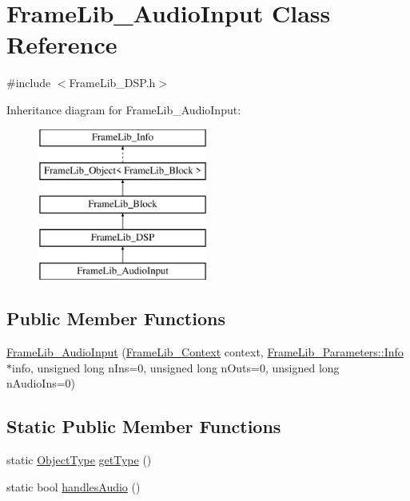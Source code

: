 \hypertarget{class_frame_lib___audio_input}{}\section{Frame\+Lib\+\_\+\+Audio\+Input Class Reference}
\label{class_frame_lib___audio_input}


{\ttfamily \#include $<$Frame\+Lib\+\_\+\+D\+S\+P.\+h$>$}

Inheritance diagram for Frame\+Lib\+\_\+\+Audio\+Input\+:\begin{figure}[H]
\begin{center}
\leavevmode
\includegraphics[height=5.000000cm]{class_frame_lib___audio_input}
\end{center}
\end{figure}
\subsection*{Public Member Functions}
\begin{DoxyCompactItemize}
\item 
\hyperlink{class_frame_lib___audio_input_ae4d7b6fccecd6cb0de7884f89ab7875e}{Frame\+Lib\+\_\+\+Audio\+Input} (\hyperlink{class_frame_lib___context}{Frame\+Lib\+\_\+\+Context} context, \hyperlink{class_frame_lib___parameters_1_1_info}{Frame\+Lib\+\_\+\+Parameters\+::\+Info} $\ast$info, unsigned long n\+Ins=0, unsigned long n\+Outs=0, unsigned long n\+Audio\+Ins=0)
\end{DoxyCompactItemize}
\subsection*{Static Public Member Functions}
\begin{DoxyCompactItemize}
\item 
static \hyperlink{_frame_lib___types_8h_a842c5e2e69277690b064bf363c017980}{Object\+Type} \hyperlink{class_frame_lib___audio_input_a8a6f94b1530b3fd5b604d3151fad5220}{get\+Type} ()
\item 
static bool \hyperlink{class_frame_lib___audio_input_ad0586445ce01e95a3c832ecdc5dc1200}{handles\+Audio} ()
\end{DoxyCompactItemize}
